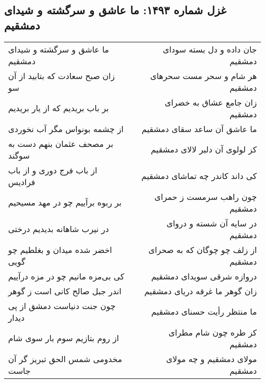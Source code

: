 \begin{center}
\section*{غزل شماره ۱۴۹۳: ما عاشق و سرگشته و شیدای دمشقیم}
\label{sec:1493}
\begin{longtable}{l p{0.5cm} r}
ما عاشق و سرگشته و شیدای دمشقیم
&&
جان داده و دل بسته سودای دمشقیم
\\
زان صبح سعادت که بتابید از آن سو
&&
هر شام و سحر مست سحرهای دمشقیم
\\
بر باب بریدیم که از یار بریدیم
&&
زان جامع عشاق به خضرای دمشقیم
\\
از چشمه بونواس مگر آب نخوردی
&&
ما عاشق آن ساعد سقای دمشقیم
\\
بر مصحف عثمان بنهم دست به سوگند
&&
کز لولوی آن دلبر لالای دمشقیم
\\
از باب فرج دوری و از باب فرادیس
&&
کی داند کاندر چه تماشای دمشقیم
\\
بر ربوه برآییم چو در مهد مسیحیم
&&
چون راهب سرمست ز حمرای دمشقیم
\\
در نیرب شاهانه بدیدیم درختی
&&
در سایه آن شسته و دروای دمشقیم
\\
اخضر شده میدان و بغلطیم چو گویی
&&
از زلف چو چوگان که به صحرای دمشقیم
\\
کی بی‌مزه مانیم چو در مزه درآییم
&&
دروازه شرقی سویدای دمشقیم
\\
اندر جبل صالح کانی است ز گوهر
&&
زان گوهر ما غرقه دریای دمشقیم
\\
چون جنت دنیاست دمشق از پی دیدار
&&
ما منتظر رأیت حسنای دمشقیم
\\
از روم بتازیم سوم بار سوی شام
&&
کز طره چون شام مطرای دمشقیم
\\
مخدومی شمس الحق تبریز گر آن جاست
&&
مولای دمشقیم و چه مولای دمشقیم
\\
\end{longtable}
\end{center}

